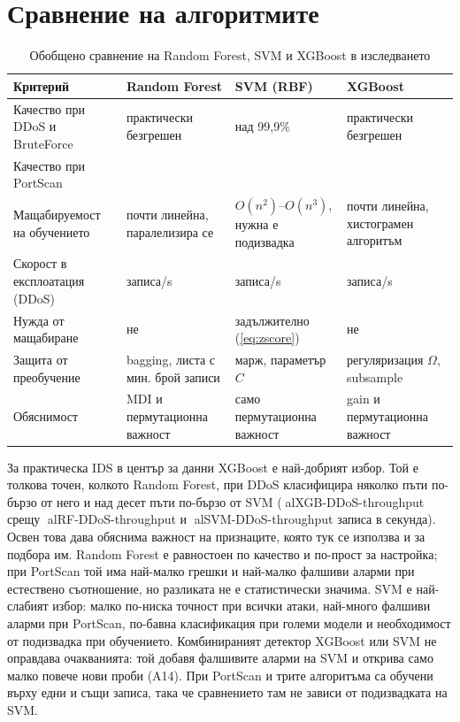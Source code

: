 \section{Сравнение на алгоритмите}
\begin{table}[H]
\centering\small
\caption{Обобщено сравнение на Random Forest, SVM и XGBoost в изследването}\label{tab:algo-compare}
\begin{tabularx}{\textwidth}{@{}l L L L@{}}
\toprule
\textsf{\textbf{Критерий}} & \textsf{\textbf{Random Forest}} & \textsf{\textbf{SVM (RBF)}} & \textsf{\textbf{XGBoost}}\\
\midrule
Качество при DDoS и BruteForce & практически безгрешен & над 99,9\% & практически безгрешен\\
Качество при PortScan &  &  & \\
Мащабируемост на обучението & почти линейна, паралелизира се & $O(n^2)$--$O(n^3)$, нужна е подизвадка & почти линейна, хистограмен алгоритъм\\
Скорост в експлоатация (DDoS) &  записа/s &  записа/s &  записа/s\\
Нужда от мащабиране & не & задължително (\cref{eq:zscore}) & не\\
Защита от преобучение & bagging, листа с мин. брой записи & марж, параметър $C$ & регуляризация $\Omega$, subsample\\
Обяснимост & MDI и пермутационна важност & само пермутационна важност & gain и пермутационна важност\\
\bottomrule
\end{tabularx}
\end{table}

За практическа IDS в център за данни XGBoost е най-добрият избор. Той е толкова точен, колкото Random Forest, при DDoS класифицира няколко пъти по-бързо от него и над десет пъти по-бързо от SVM (al{XGB-DDoS-throughput} срещу al{RF-DDoS-throughput} и al{SVM-DDoS-throughput} записа в секунда). Освен това дава обяснима важност на признаците, която тук се използва и за подбора им. Random Forest е равностоен по качество и по-прост за настройка; при PortScan той има най-малко грешки и най-малко фалшиви аларми при естествено съотношение, но разликата не е статистически значима. SVM е най-слабият избор: малко по-ниска точност при всички атаки, най-много фалшиви аларми при PortScan, по-бавна класификация при големи модели и необходимост от подизвадка при обучението. Комбинираният детектор XGBoost или SVM не оправдава очакванията: той добавя фалшивите аларми на SVM и открива само малко повече нови проби (A14). При PortScan и трите алгоритъма са обучени върху едни и същи  записа, така че сравнението там не зависи от подизвадката на SVM.

